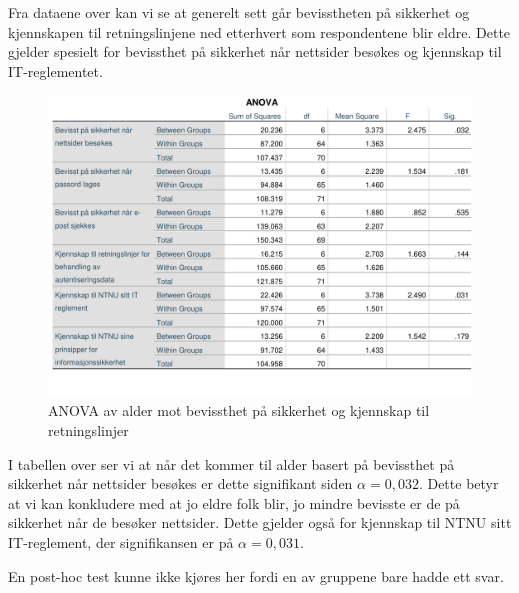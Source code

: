 Fra dataene over kan vi se at generelt sett går bevisstheten på sikkerhet og kjennskapen til retningslinjene ned etterhvert som respondentene blir eldre. Dette gjelder spesielt for bevissthet på sikkerhet når nettsider besøkes og kjennskap til IT-reglementet. 

\begin{figure}[H]
    \centering
    \includegraphics[scale=0.7]{case_2/bilder/spss/anova_ttest/alder_bevissthetogkjennskap_anova.pdf}
    \caption[alder-bevissthetogkjennskap-ANOVA]{ANOVA av alder mot bevissthet på sikkerhet og kjennskap til retningslinjer}
    \label{fig:alder-bevissthetogkjennskap-ANOVA}
\end{figure}

I tabellen over ser vi at når det kommer til alder basert på bevissthet på sikkerhet når nettsider besøkes er dette signifikant siden \(\alpha = 0,032\). Dette betyr at vi kan konkludere med at jo eldre folk blir, jo mindre bevisste er de på sikkerhet når de besøker nettsider. Dette gjelder også for kjennskap til NTNU sitt IT-reglement, der signifikansen er på \(\alpha = 0,031\). 

En post-hoc test kunne ikke kjøres her fordi en av gruppene bare hadde ett svar. 

